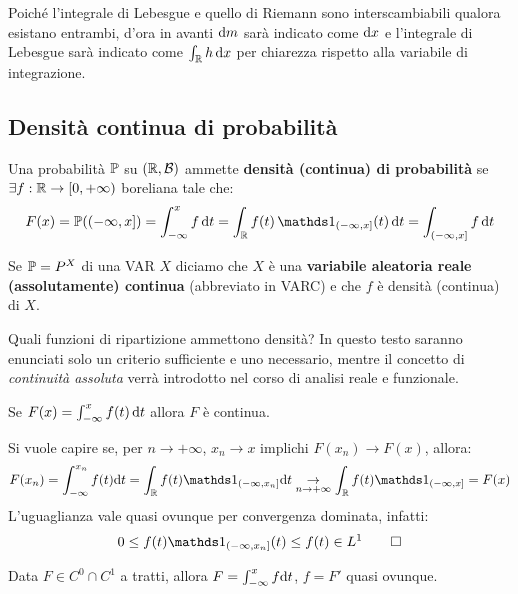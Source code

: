 Poiché l'integrale di Lebesgue e quello di Riemann sono interscambiabili qualora esistano entrambi, d'ora in avanti $\mathrm d m$ sarà indicato come $\mathrm d x$ e l'integrale di Lebesgue sarà indicato come $\int_\mathbb R h \, \mathrm d x$ per chiarezza rispetto alla variabile di integrazione.

\subsection{Densità continua di probabilità}

\begin{defn}
  Una probabilità $\mathbb P$ su $(\mathbb R, \mathcal B)$ ammette \textbf{densità (continua) di probabilità} se $\exists f:\mathbb R \to [0, +\infty)$ boreliana tale che:
  $$F(x) = \PP((-\infty, x]) = \int_{-\infty}^{x} f \, \de t = \int_{\RR} f(t) \, \Ind_{(-\infty, x]}(t) \, \de t = \int_{(-\infty, x]} f \, \de t$$

  Se $\mathbb P = P^X$ di una VAR $X$ diciamo che $X$ è una \textbf{variabile aleatoria reale (assolutamente) continua} (abbreviato in VARC) e che $f$ è densità (continua) di $X$.
\end{defn}

Quali funzioni di ripartizione ammettono densità? In questo testo saranno enunciati solo un criterio sufficiente e uno necessario, mentre il concetto di \emph{continuità assoluta} verrà introdotto nel corso di analisi reale e funzionale.
\medskip

\begin{prop}
  Se $F(x)=\int_{-\infty}^{x}f(t) \, \mathrm d t$ allora $F$ è continua.
\end{prop}

\begin{dimo}
  \leavevmode
  Si vuole capire se, per $n \to +\infty$, $x_n \to x$ implichi $F(x_n) \to F(x)$, allora:
  $$F(x_n) = \int_{-\infty}^{x_n} f(t) \de t = \int_{\RR} f(t) \Ind_{(-\infty, x_n]} \de t \underset{n \to +\infty}{\to} \int_{\RR} f(t) \Ind_{(-\infty, x]} = F(x)$$
  L'uguaglianza vale quasi ovunque per convergenza dominata, infatti:
  $$0 \leq f(t) \Ind_{(-\infty, x_n]}(t) \leq f(t) \in L^1 \qedhere$$
\end{dimo}

\medskip
\begin{prop}
  Data $F \in C^0 \cap C^1$ a tratti, allora $F = \int_{-\infty}^x f \mathrm d t$, $f = F'$ quasi ovunque.
\end{prop}

